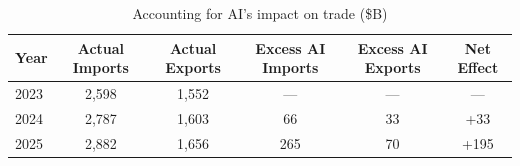 \begin{table}[htbp]
\centering
\caption{Accounting for AI's impact on trade (\$B)}
\label{tab:counterfactual_summary}
\setlength{\tabcolsep}{1.75mm}
\renewcommand{\arraystretch}{1.60}
{\small
\begin{tabular}{lccccc}
\toprule
Year & Actual Imports & Actual Exports & Excess AI Imports & Excess AI Exports & Net Effect \\
\midrule
2023 & 2,598 & 1,552 & --- & --- & --- \\
2024 & 2,787 & 1,603 & 66 & 33 & +33 \\
2025 & 2,882 & 1,656 & 265 & 70 & +195 \\
\bottomrule
\end{tabular}}
\end{table}
